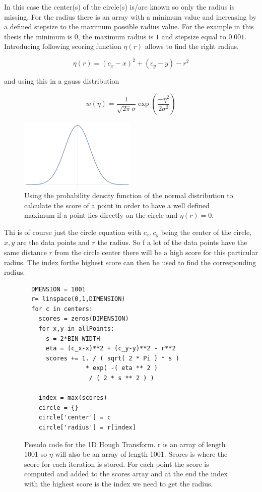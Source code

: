 \documentclass[10pt,twoside]{scrreprt}
\begin{document}
In this case the center(s) of the circle(s) is/are known so only the radius is missing. For the radius there is an array with a minimum value
and increasing by a defined stepsize to the maximum possible radius value. For the example in this thesis the minimum is $0$, the maximum radius
is $1$ and stepsize equal to $0.001$. Introducing following scoring function $\eta(r)$ allows to find the right radius.

\begin{equation}
\label{eq:score_function}
  \eta(r) = (c_x - x)^2 + (c_y - y) - r ^ 2
\end{equation}

and using this in a gauss distribution

\begin{equation}
\label{eq:weight_function}
  w(\eta) = \frac{1}{\sqrt{2\pi}\sigma}\exp\left( \frac{-\eta^2}{2\sigma^2}\right)
\end{equation}
\begin{figure}[tb]
  \centering
  \includegraphics[width=0.5\textwidth]{pics/gauss}
  \caption{Using the probability density function of the normal distribution to calculate the score of a point in order to have a well defined maximum if a point
  lies directly on the circle and $\eta(r) = 0$. }
  \label{fig:gauss}
\end{figure}
Thi is of course just the circle equation with $c_x, c_y$ being the center of the circle, $x, y$ are the data points and $r$ the radius.
So f a lot of the data points have the same distance $r$ from the circle center there will be a high score for this particular radius. The index
forthe highest score can then be used to find the corresponding radius.

\begin{figure}
  \begin{lstlisting}
  DMENSION = 1001
  r= linspace(0,1,DIMENSION)
  for c in centers:
    scores = zeros(DIMENSION)
    for x,y in allPoints:
      s = 2*BIN_WIDTH
      eta = (c_x-x)**2 + (c_y-y)**2 - r**2
      scores += 1. / ( sqrt( 2 * Pi ) * s ) 
                 * exp( -( eta ** 2 ) 
                  / ( 2 * s ** 2 ) )
  
    index = max(scores)
    circle = {}
    circle['center'] = c
    circle['radius'] = r[index]
\end{lstlisting}
\caption{Pseudo code for the 1D Hough Transform. r is an array of length 1001 so $\eta$ will also be an array of length 1001. Scores is where the score for each iteration is stored. For each point the score is computed and added to the scores array and at the end the index with the highest score is the index we need to get the radius.}
\end{figure}
\end{document}
